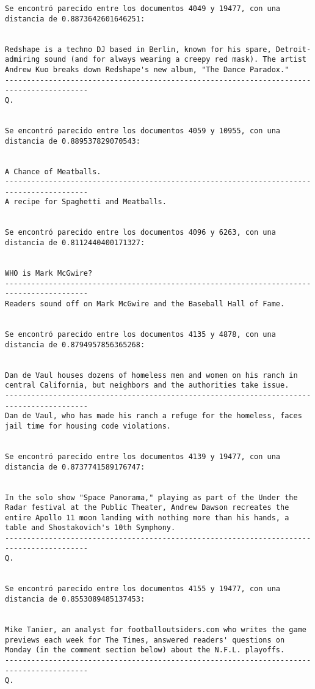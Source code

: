 \documentclass[11pt]{article}
\begin{document}
\begin{Verbatim}[commandchars=\\\{\}]
Se encontró parecido entre los documentos 4049 y 19477, con una distancia de 0.8873642601646251:


Redshape is a techno DJ based in Berlin, known for his spare, Detroit-admiring sound (and for always wearing a creepy red mask). The artist Andrew Kuo breaks down Redshape's new album, "The Dance Paradox."
-----------------------------------------------------------------------------------------
Q.


Se encontró parecido entre los documentos 4059 y 10955, con una distancia de 0.889537829070543:


A Chance of Meatballs.
-----------------------------------------------------------------------------------------
A recipe for Spaghetti and Meatballs.


Se encontró parecido entre los documentos 4096 y 6263, con una distancia de 0.8112440400171327:


WHO is Mark McGwire?
-----------------------------------------------------------------------------------------
Readers sound off on Mark McGwire and the Baseball Hall of Fame.


Se encontró parecido entre los documentos 4135 y 4878, con una distancia de 0.8794957856365268:


Dan de Vaul houses dozens of homeless men and women on his ranch in central California, but neighbors and the authorities take issue.
-----------------------------------------------------------------------------------------
Dan de Vaul, who has made his ranch a refuge for the homeless, faces jail time for housing code violations.


Se encontró parecido entre los documentos 4139 y 19477, con una distancia de 0.8737741589176747:


In the solo show "Space Panorama," playing as part of the Under the Radar festival at the Public Theater, Andrew Dawson recreates the entire Apollo 11 moon landing with nothing more than his hands, a table and Shostakovich's 10th Symphony.
-----------------------------------------------------------------------------------------
Q.


Se encontró parecido entre los documentos 4155 y 19477, con una distancia de 0.8553089485137453:


Mike Tanier, an analyst for footballoutsiders.com who writes the game previews each week for The Times, answered readers' questions on Monday (in the comment section below) about the N.F.L. playoffs.
-----------------------------------------------------------------------------------------
Q.



\end{Verbatim}
\end{document}
